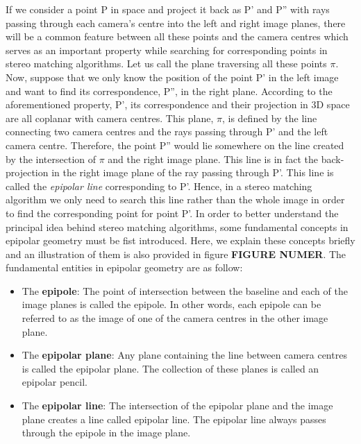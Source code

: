 \documentclass[dvips,letterpaper,12pt]{report}
\begin{document}
If we consider a point P in space and project it back as P' and P'' with rays passing through each camera's centre
into the left and right image planes, there will be a common feature between all these points and the camera centres which serves as an important property while searching for corresponding points
in stereo matching algorithms. Let us call the plane traversing all these points $\pi$.
Now, suppose that we only know the position of the point P' in the left image and want to find its correspondence, P'', in the right plane. According to the aforementioned property, P',
its correspondence and their projection in 3D space are all coplanar with camera centres. This plane, $\pi$, is defined by the line connecting two camera centres and 
the rays passing through P' and the left camera centre. Therefore, the point P'' would lie somewhere on the line created by the intersection of $\pi$ and the right image plane.
This line is in fact the back-projection in the right image plane of the ray passing through P'. This line is called the {\it epipolar line} corresponding to P'. Hence, in a stereo matching algorithm
we only need to search this line rather than the whole image in order to find the corresponding point for point P'.
In order to better understand the principal idea behind stereo matching algorithms, some fundamental concepts in epipolar geometry must be fist introduced. 
Here, we explain these concepts briefly and an illustration of them is also provided in figure \textbf{FIGURE NUMER}.
\newline
The fundamental entities in epipolar geometry are as follow: \cite{hart2000}
\begin{itemize}
\item The \textbf{epipole}: The point of intersection between the baseline and each of the image planes is called the epipole. In other words, each epipole can be referred to as the image of one of
the camera centres in the other image plane.

\item The \textbf{epipolar plane}: Any plane containing the line between camera centres is called the epipolar plane. The collection of these planes is called an epipolar pencil. 

\item The \textbf{epipolar line}: The intersection of the epipolar plane and the image plane creates a line called epipolar line. The epipolar line always passes through the epipole in the 
image plane.
\end{itemize}
\end{document}
